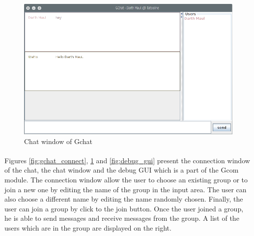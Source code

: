 \begin{figure}[h]
    \begin{center}
        \includegraphics[scale=0.4]{figures/gchat_chat.png}
    \end{center}
    \caption{Chat window of Gchat}
    \label{fig:gchat_chat}
\end{figure}

\paragraph{}{
    Figures \ref{fig:gchat_connect}, \ref{fig:gchat_chat} and \ref{fig:debug_gui}
 present the connection window of the chat, the chat window and the debug GUI
 which is a part of the Gcom module. \newline
 The connection window allow the user to choose an existing group or to join
 a new one by editing the name of the group in the input area. The user can also
 choose a different name by editing the name randomly chosen. Finally, the user
 can join a group by click to the join button. \newline
 Once the user joined a group, he is able to send messages and receive messages
 from the group. A list of the users which are in the group are displayed
 on the right.
}


